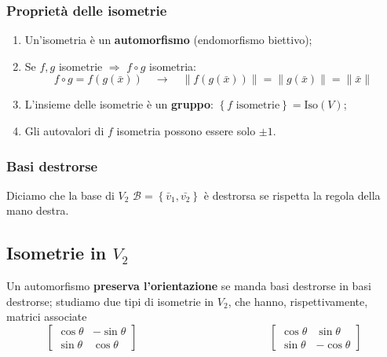 \documentclass[x11names]{article}
\begin{document}
\subsubsection{Proprietà delle isometrie}
\begin{enumerate}
	\item Un'isometria è un \textbf{automorfismo} (endomorfismo biettivo);
	\item Se $f,g$ isometrie $\Longrightarrow$ $f \circ g$ isometria:
	\[
	f \circ g  = f(g(\bar{x})) \quad \to \quad \|f(g(\bar{x}))\| = \|g(\bar{x})\| = \|\bar{x}\| 
	\]
	\item L'insieme delle isometrie è un \textbf{gruppo}: $\left\{f \text{ isometrie}\right\} = \text{Iso}(V)$;
	\item Gli autovalori di $f$ isometria possono essere solo $\pm 1$.
\end{enumerate}

\subsubsection{Basi destrorse}
Diciamo che la base di $V_{2}$ $\mathcal{B} = \left\{\bar{v}_{1},\bar{v_{2}}\right\}$ è destrorsa se rispetta la regola della mano destra.



\subsection{Isometrie in $V_{2}$}
Un automorfismo \textbf{preserva l'orientazione} se manda basi destrorse in basi destrorse; studiamo due tipi di isometrie in $V_{2}$, che hanno, rispettivamente, matrici associate
\[
\begin{bmatrix}
	\cos{\theta} & -\sin{\theta} \\
	\sin{\theta} & \cos{\theta}
\end{bmatrix}
\qquad \qquad \qquad \qquad \qquad \qquad
\begin{bmatrix}
	\cos{\theta} & \sin{\theta} \\
	\sin{\theta} & -\cos{\theta}
\end{bmatrix}
\] 

\vspace{1cm}

\begin{center}
	
\end{center}
\end{document}
